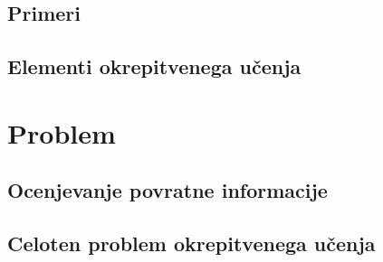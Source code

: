 \documentclass[a4paper, oneside, 12pt]{report}
\begin{document}



\section{Primeri}

\section{Elementi okrepitvenega učenja}
\newpage

\chapter{Problem} \label{chapter:Problem}
\thispagestyle{fancy}
\section{Ocenjevanje povratne informacije}
\section{Celoten problem okrepitvenega učenja}
\newpage

\end{document}
